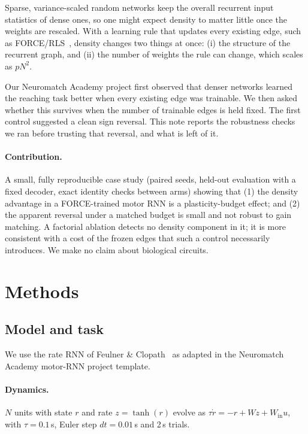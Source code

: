 \documentclass[11pt]{article}
\begin{document}
Sparse, variance-scaled random networks keep the overall recurrent input
statistics of dense ones, so one might expect density to matter little once
the weights are rescaled. With a learning rule that updates every existing
edge, such as FORCE/RLS~\cite{sussillo2009generating}, density changes two
things at once: (i) the structure of the recurrent graph, and (ii) the number
of weights the rule can change, which scales as $pN^2$.

Our Neuromatch Academy project first observed that denser networks learned
the reaching task better when every existing edge was trainable. We then asked
whether this survives when the number of trainable edges is held fixed. The
first control suggested a clean sign reversal. This note reports the
robustness checks we ran before trusting that reversal, and what is left of
it.

\paragraph{Contribution.} A small, fully reproducible case study (paired
seeds, held-out evaluation with a fixed decoder, exact identity checks between
arms) showing that
(1) the density advantage in a FORCE-trained motor RNN is a plasticity-budget
effect; and
(2) the apparent reversal under a matched budget is small and not robust to
gain matching. A factorial ablation detects no density component in it; it is
more consistent with a cost of the frozen edges that such a control
necessarily introduces.
We make no claim about biological circuits.

\section{Methods}

\subsection{Model and task}

We use the rate RNN of Feulner \& Clopath~\cite{feulner2021neural} as adapted
in the Neuromatch Academy motor-RNN project template.

\paragraph{Dynamics.} $N$ units with state $r$ and rate $z=\tanh(r)$ evolve as
$\tau\dot r=-r+Wz+W_{\text{in}}u$, with $\tau=0.1$\,s, Euler step
$dt=0.01$\,s and 2\,s trials.
\end{document}
